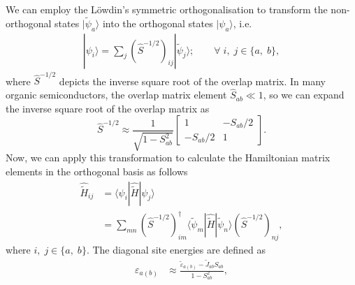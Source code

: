 We can employ the L\"{o}wdin's symmetric orthogonalisation \cite{Lwdin1950} to transform the non-orthogonal states $|\tilde{\psi}_a\rangle$ into the orthogonal states $|\psi_a\rangle$, i.e.
\begin{equation} \label{equ:2.99}
\begin{split}
|\psi_{i}\rangle = \sum_{j}(\hat{S}^{-1/2})_{ij} |\tilde{\psi}_{j}\rangle;
\quad\quad \forall\;i,\;j\in\{a,\;b\},
\end{split}
\end{equation}
where $\hat{S}^{-1/2}$ depicts the inverse square root of the overlap matrix.
In many organic semiconductors, the overlap matrix element $\hat{S}_{ab} \ll 1$, so we can expand the inverse square root of the overlap matrix as
\begin{equation} \label{equ:2.100}
    \hat{S}^{-1/2} \approx 
    \frac{1}{\sqrt{1-S_{ab}^{2}}}
    \begin{bmatrix}
        1  &  -S_{ab}/2\\
        -S_{ab}/2 & 1
    \end{bmatrix}.
\end{equation}
Now, we can apply this transformation to calculate the Hamiltonian matrix elements in the orthogonal basis as follows
\begin{equation} \label{equ:2.101}
\begin{split}
\hat{\tilde{H}}_{ij}
&=\langle\psi_{i}|\hat{\tilde{H}}|\psi_{j}\rangle \\ 
&= \sum_{mn}(\hat{S}^{-1/2})^{\dagger}_{im} 
\langle\tilde{\psi}_{m}|
\hat{\tilde{H}}
|\tilde{\psi}_{n}\rangle
(\hat{S}^{-1/2})_{nj},
\end{split}
\end{equation}
where $i,\;j\in \{a,\;b\}$.
The diagonal site energies are defined as
\begin{equation} \label{equ:2.102}
\begin{split}
\varepsilon_{a(b)}
&\approx\frac{\tilde{\varepsilon}_{a(b)}-\tilde{J}_{ab}S_{ab}}{1-S_{ab}^{2}},
\end{split}
\end{equation}
